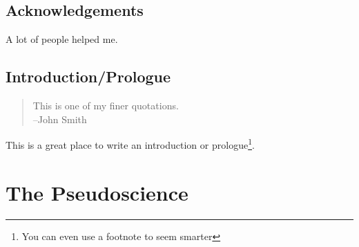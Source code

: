 \documentclass[oneside,11pt]{book} %
\theoremstyle{definition}
\theoremstyle{remark}
\begin{document}
    \chapter{Acknowledgements}
    A lot of people helped me.


    \newpage %


    \tableofcontents %


    \chapter*{Introduction/Prologue} %

    \begin{quote}
        This is one of my finer quotations.\\
        --John Smith
    \end{quote}

    This is a great place to write an introduction or prologue\footnote{You can even use a footnote to seem smarter}.

    \part{The Pseudoscience}
    
    
\end{document}
